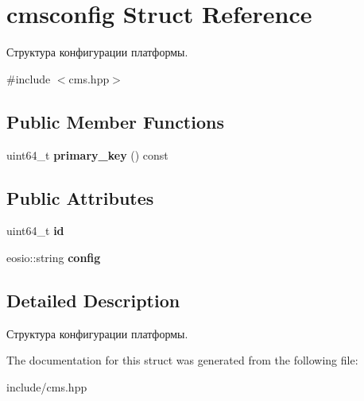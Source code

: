 \hypertarget{structcmsconfig}{}\section{cmsconfig Struct Reference}
\label{structcmsconfig}


Структура конфигурации платформы.  




{\ttfamily \#include $<$cms.\+hpp$>$}

\subsection*{Public Member Functions}
\begin{DoxyCompactItemize}
\item 
\mbox{\label{structcmsconfig_a5cc5281bf9358c20832663492af8e9f9}} 
uint64\+\_\+t {\bfseries primary\+\_\+key} () const
\end{DoxyCompactItemize}
\subsection*{Public Attributes}
\begin{DoxyCompactItemize}
\item 
\mbox{\label{structcmsconfig_a242e7cb1cc8bbfe1b25f16b8b45597bb}} 
uint64\+\_\+t {\bfseries id}
\item 
\mbox{\label{structcmsconfig_a79dffc55a16afae47f1aa6746dfa97d5}} 
eosio\+::string {\bfseries config}
\end{DoxyCompactItemize}


\subsection{Detailed Description}
Структура конфигурации платформы. 

The documentation for this struct was generated from the following file\+:\begin{DoxyCompactItemize}
\item 
include/cms.\+hpp\end{DoxyCompactItemize}
